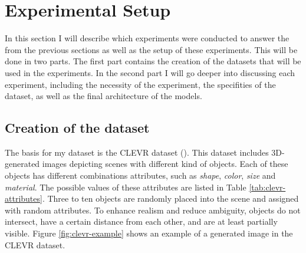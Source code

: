 \section{Experimental Setup}
\label{sec:exp-setup}

In this section I will describe which experiments were conducted to answer the  from the previous sections as well as the setup of these experiments. This will be done in two parts. The first part contains the creation of the datasets that will be used in the experiments. In the second part I will go deeper into discussing each experiment, including the necessity of the experiment, the specifities of the dataset, as well as the final architecture of the models.

\subsection{Creation of the dataset}
The basis for my dataset is the CLEVR dataset (\cite{Johnson2016}). This dataset includes 3D-generated images depicting scenes with different kind of objects. Each of these objects has different combinations attributes, such as \emph{shape}, \emph{color}, \emph{size} and \emph{material}. The possible values of these attributes are listed in Table \ref{tab:clevr-attributes}. Three to ten objects are randomly placed into the scene and assigned with random attributes. To enhance realism and reduce ambiguity, objects do not intersect, have a certain distance from each other, and are at least partially visible.
Figure \ref{fig:clevr-example} shows an example of a generated image in the CLEVR dataset.

